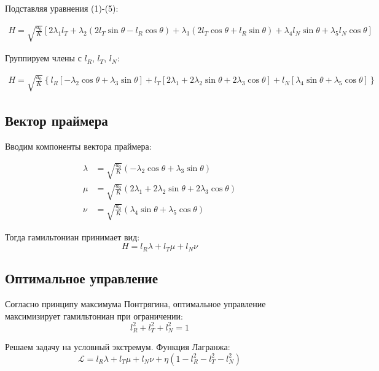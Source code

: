 \documentclass[12pt]{article}
\begin{document}
Подставляя уравнения (1)-(5):

\begin{align*}
H = \sqrt{\frac{a_0}{K}} \left[ 
2\lambda_1 l_T + 
\lambda_2 (2l_T \sin \theta - l_R \cos \theta) + 
\lambda_3 (2l_T \cos \theta + l_R \sin \theta) + 
\lambda_4 l_N \sin \theta + 
\lambda_5 l_N \cos \theta
\right]
\end{align*}

Группируем члены с $l_R$, $l_T$, $l_N$:

\begin{align*}
H = \sqrt{\frac{a_0}{K}} \left\{
l_R [-\lambda_2 \cos \theta + \lambda_3 \sin \theta] +
l_T [2\lambda_1 + 2\lambda_2 \sin \theta + 2\lambda_3 \cos \theta] +
l_N [\lambda_4 \sin \theta + \lambda_5 \cos \theta]
\right\}
\end{align*}

\subsection{Вектор праймера}

Вводим компоненты вектора праймера:

\begin{align}
\lambda &= \sqrt{\frac{a_0}{K}} (-\lambda_2 \cos \theta + \lambda_3 \sin \theta) \tag{8} \\
\mu &= \sqrt{\frac{a_0}{K}} (2\lambda_1 + 2\lambda_2 \sin \theta + 2\lambda_3 \cos \theta) \tag{9} \\
\nu &= \sqrt{\frac{a_0}{K}} (\lambda_4 \sin \theta + \lambda_5 \cos \theta) \tag{10}
\end{align}

Тогда гамильтониан принимает вид:
\begin{equation}
H = l_R \lambda + l_T \mu + l_N \nu
\end{equation}

\subsection{Оптимальное управление}

Согласно принципу максимума Понтрягина, оптимальное управление максимизирует гамильтониан при ограничении:
\begin{equation}
l_R^2 + l_T^2 + l_N^2 = 1
\end{equation}

Решаем задачу на условный экстремум. Функция Лагранжа:
\begin{equation}
\mathcal{L} = l_R \lambda + l_T \mu + l_N \nu + \eta (1 - l_R^2 - l_T^2 - l_N^2)
\end{equation}
\end{document}
